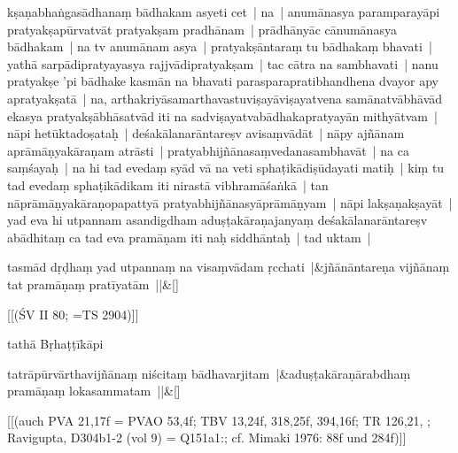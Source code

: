 \documentclass[article,a4paper]{memoir}
\begin{document}
	  \pstart kṣaṇabhaṅgasā\-dhanaṃ bā\-dhakam asyeti cet | na | anumā\-nasya paramparayā\-pi pratyakṣapū\-rvatvā\-t pratyakṣam pradhā\-nam | prā\-dhā\-nyā\-c cā\-numā\-nasya bā\-dhakam | na tv anumā\-nam asya | pratyakṣā\-ntaraṃ tu bā\-dhakaṃ bhavati | yathā\- sarpā\-dipratyayasya rajjvā\-dipratyakṣam | tac cā\-tra na sambhavati | \label{thakur75-112.28} nanu pratyakṣe 'pi bā\-dhake kasmā\-n na bhavati parasparapratibhandhena dvayor apy apratyakṣatā\- | \label{thakur75-112.28a} na, arthakriyā\-samarthavastuviṣayā\-viṣayatvena samā\-natvā\-bhā\-vā\-d ekasya pratyakṣā\-bhā\-satvā\-d iti na sadviṣayatvabā\-dhakapratyayā\-n mithyā\-tvam | \label{thakur75-113.1} nā\-pi hetū\-ktadoṣataḥ | deśakā\-lanarā\-ntareṣv avisaṃvā\-dā\-t | \label{thakur75-113.2} nā\-py ajñā\-nam aprā\-mā\-ṇyakā\-raṇam atrā\-sti | pratyabhijñā\-nasaṃvedanasambhavā\-t | \label{thakur75-113.3} na ca saṃśayaḥ | na hi tad evedaṃ syā\-d vā\- na veti sphaṭikā\-diṣū\-dayati matiḥ | kiṃ tu tad evedaṃ sphaṭikā\-dikam iti nirastā\- vibhramā\-śaṅkā\- | tan nā\-prā\-mā\-ṇyakā\-raṇopapattyā\- pratyabhijñā\-nasyā\-prā\-mā\-ṇyam | \label{thakur75-113.5} nā\-pi lakṣaṇakṣayā\-t | yad eva hi utpannam asandigdham aduṣṭakā\-raṇajanyaṃ deśakā\-lanarā\-ntareṣv abā\-dhitaṃ ca tad eva pramā\-ṇam iti naḥ siddhā\-ntaḥ | tad uktam |
	\pend
      
	    
	    \stanza[\smallbreak]
tasmā\-d dṛḍhaṃ yad utpannaṃ na visaṃvā\-dam ṛcchati |&jñā\-nā\-ntareṇa vijñā\-naṃ tat pramā\-ṇaṃ pratī\-yatā\-m ||\&[\smallbreak]


	[[(ŚV II 80; =TS 2904)]]

	  \pstart tathā\- Bṛhaṭṭī\-kā\-pi
	\pend
      
	    
	    \stanza[\smallbreak]
tatrā\-pū\-rvā\-rthavijñā\-naṃ niścitaṃ bā\-dhavarjitam |&aduṣṭakā\-raṇā\-rabdhaṃ pramā\-ṇaṃ lokasammatam ||\&[\smallbreak]


	[[(auch PVA 21,17f = PVAO 53,4f; TBV 13,24f, 318,25f, 394,16f; TR 126,21, ; Ravigupta, D304b1-2 (vol 9) = Q151a1:; cf. Mimaki 1976: 88f und 284f)]]
\end{document}
